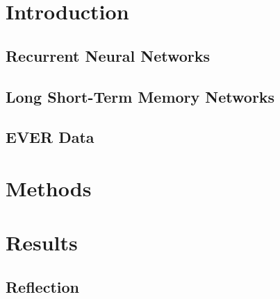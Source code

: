 \documentclass[12pt]{article}
\begin{document}


\tableofcontents
\newpage


\section{Introduction}\label{sec:intro}

\subsection{Recurrent Neural Networks}
 
\subsection{Long Short-Term Memory Networks}

\subsection{EVER Data}

%
\section{Methods}\label{sec:methods}

%
\section{Results}\label{sec:results}

\subsection{Reflection}



\newpage


\nocite{*}


\end{document}
